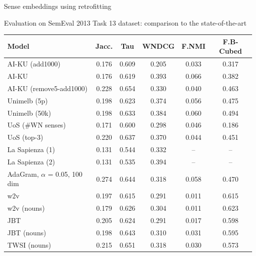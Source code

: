 \documentclass{beamer}
\begin{document}
\begin{frame}{Sense embeddings using retrofitting}

Evaluation on SemEval 2013 Task 13 dataset: comparison to the state-of-the-art

	\vspace{-0.4cm}
	\footnotesize
	\begin{center}
		\begin{tabular}{l|ccc|cc}
			\bf Model & \bf Jacc. & \bf Tau & \bf WNDCG & \bf F.NMI & \bf F.B-Cubed \\ 
			\midrule
			
			AI-KU (add1000) & 0.176 & 0.609 & 0.205 & 0.033 & 0.317 \\
			AI-KU & 0.176 & 0.619 & 0.393 & 0.066 & 0.382 \\
			AI-KU (remove5-add1000) & 0.228 & 0.654 & 0.330 & 0.040 & 0.463 \\
			Unimelb (5p) & 0.198 & 0.623 & 0.374 & 0.056 & 0.475 \\
			Unimelb (50k) & 0.198 & 0.633 & 0.384 & 0.060 & 0.494 \\
			UoS (\#WN senses) & 0.171 & 0.600 & 0.298 & 0.046 & 0.186 \\
			UoS (top-3) & 0.220 & 0.637 & 0.370 & 0.044 & 0.451 \\
			La Sapienza (1) & 0.131 & 0.544 & 0.332 & --  & -- \\
			La Sapienza (2) & 0.131 & 0.535 & 0.394 & -- & -- \\ \midrule
			AdaGram, $\alpha$ = 0.05, 100 dim & 0.274 & 0.644  & 0.318  & 0.058  & 0.470  \\ \midrule
			\alert{w2v}  & 0.197 & 0.615 & 0.291 & 0.011 & 0.615 \\
			\alert{w2v (nouns)} & 0.179 & 0.626 & 0.304 & 0.011 & 0.623 \\
			
			\alert{JBT} & 0.205 & 0.624 & 0.291 & 0.017 & 0.598\\
			\alert{JBT (nouns)} & 0.198 & 0.643 & 0.310 & 0.031 & 0.595\\
			\alert{TWSI (nouns)} & 0.215 & 0.651 & 0.318 & 0.030 & 0.573 \\ 
				
		\end{tabular}
	\end{center}
\end{frame}
\end{document}
